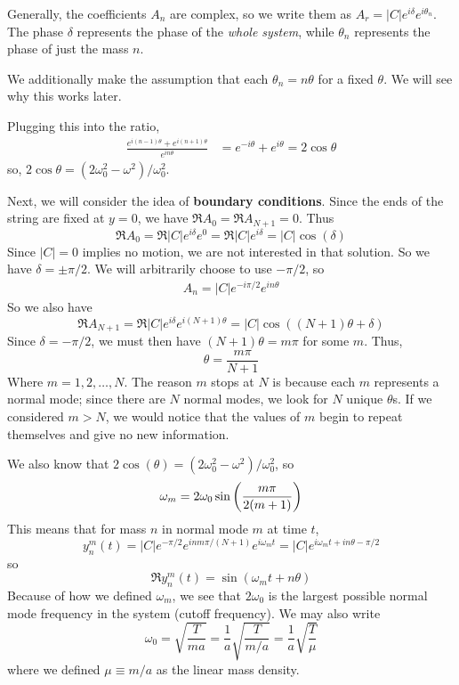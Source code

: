 Generally, the coefficients $A_n$ are complex, so we write them as $A_r = |C|e^{i\delta}e^{i\theta_n}$. The phase $\delta$ represents the phase of the \textit{whole system}, while $\theta_n$ represents the phase of just the mass $n$.

We additionally make the assumption that each $\theta_n = n\theta$ for a fixed $\theta$. We will see why this works later. 

Plugging this into the ratio,
\begin{align*}
    \frac{e^{i(n-1)\theta}+e^{i(n+1)\theta}}{e^{in\theta}}  &= e^{-i\theta}+e^{i\theta} = 2\cos\theta 
\end{align*}
so, $2\cos\theta = (2\omega_0^2-\omega^2)/\omega_0^2$.

Next, we will consider the idea of \textbf{boundary conditions}. Since the ends of the string are fixed at $y=0$, we have $\Re A_0 = \Re A_{N+1} = 0$. Thus
\[ \Re A_0  = \Re |C|e^{i\delta}e^{0} = \Re |C|e^{i\delta} = |C|\cos(\delta) \]
Since $|C|=0$ implies no motion, we are not interested in that solution. So we have $\delta = \pm \pi/2$. We will arbitrarily choose to use $-\pi/2$, so
\begin{align*}
    A_n = |C|e^{-i\pi/2}e^{in\theta}
\end{align*}
So we also have
\[ \Re A_{N+1} = \Re |C|e^{i\delta}e^{i(N+1)\theta} = |C|\cos((N+1)\theta+\delta)\]
Since $\delta=-\pi/2$, we must then have $(N+1)\theta = m\pi$ for some $m$. Thus, 
\[ \theta = \frac{m\pi}{N+1}\]
Where $m = 1, 2, \dots, N$. The reason $m$ stops at $N$ is because each $m$ represents a normal mode; since  there are $N$ normal modes, we look for $N$ unique $\theta$s. If we considered $m>N$, we would notice that the values of $m$ begin to repeat themselves and give no new information.

We also know that $2\cos(\theta) = (2\omega_0^2-\omega^2)/\omega_0^2$, so
\[ \omega_m = 2\omega_0\sin\pqty{\frac{m\pi}{2(m+1)}}\]
This means that for mass $n$ in normal mode $m$ at time $t$,
\[ y_n^m(t) = |C|e^{-\pi/2}e^{inm\pi/(N+1)}e^{i\omega_m t} = |C|e^{i\omega_m t + in\theta - \pi/2}\]
so
\[ \Re y_n^m(t) = \sin(\omega_m t + n\theta )\]
Because of how we defined $\omega_m$, we see that $2\omega_0$ is the largest possible normal mode frequency in the system (cutoff frequency). We may also write
\[ \omega_0 = \sqrt{\frac{T}{ma}} = \frac{1}{a} \sqrt{\frac{T}{m/a}} = \frac{1}{a}\sqrt{\frac{T}{\mu}}\]
where we defined $\mu\equiv m/a$ as the linear mass density.

